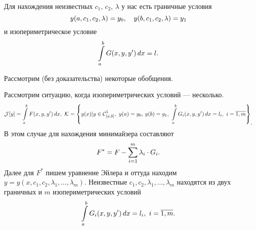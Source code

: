 \documentclass[12pt,a4paper,openany,fleqn]{book}
\newcommand{\Cf}{\ensuremath{\mathcal{C}}}
\newcommand{\J}{\ensuremath{\mathcal{J}}}
\newcommand{\mc}[1]{\ensuremath{\mathcal{#1}}}
\newcommand{\Cfn}[2][]{\ensuremath{\Cf{\mathstrut}^{#2}_{#1}}}
\newcommand{\K}{\mc{K}}
\theoremstyle{definition}
\begin{document}
Для нахождения неизвестных $c_1$, $c_2$, $\lambda$ у нас есть граничные условия 
\begin{equation*}
	\hfill y(a,c_1,c_2,\lambda)=y_0,\quad y(b,c_1,c_2,\lambda)=y_1\hfill
\end{equation*}
и изопериметрическое условие
\begin{equation*}
	\hfill\int\limits_a^b G(x,y,y')\,dx=l.\hfill
\end{equation*} 

Рассмотрим (без доказательства) некоторые обобщения.
\begin{enumerateD}
	\item Рассмотрим ситуацию, когда изопериметрических условий --- несколько.
	\begin{equation*}
	\J[y]=\int\limits_a^b F(x,y,y')\,dx,\ \K=\left\{y(x)|y\in\Cfn[{[a,b]}]{1},\ y(a)=y_0,\,y(b)=y_1,\ \int\limits_a^b G_i(x,y,y')\,dx=l_i,\ i=\overline{1,m}\right\}_{\displaystyle.}
	\end{equation*}
	В этом случае для нахождения минимайзера составляют 
	\begin{equation*}
		\hfill F^{\ast}=F-\sum\limits_{i=1}^m\lambda_i\cdot G_i.\hfill
	\end{equation*}
	Далее для $F^{\ast}$ пишем уравнение Эйлера и оттуда находим $y=y(x,c_1,c_2,\lambda_1,\ldots,\lambda_m)$. Неизвестные $c_1,c_2,\lambda_1,\ldots,\lambda_m$ находятся из двух граничных и $m$ изопериметрических условий
	\begin{equation*}
		\hfill\int\limits_a^b G_i(x,y,y')\,dx=l_i,\ i=\overline{1,m}.\hfill
	\end{equation*}
	

\end{enumerateD}
\end{document}
